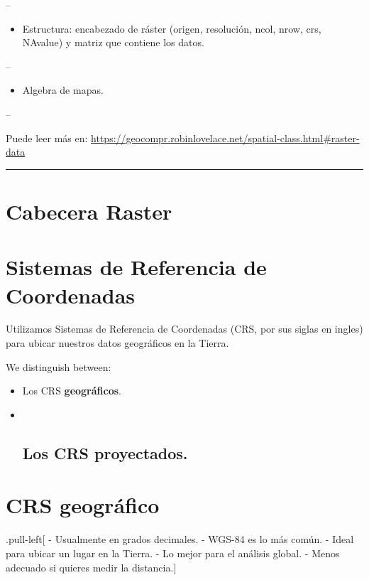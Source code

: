 \documentclass[]{article}
\providecommand{\tightlist}{%
  \setlength{\itemsep}{0pt}\setlength{\parskip}{0pt}}
\begin{document}
--

\begin{itemize}
\tightlist
\item
  Estructura: encabezado de ráster (origen, resolución, ncol, nrow, crs,
  NAvalue) y matriz que contiene los datos.
\end{itemize}

--

\begin{itemize}
\tightlist
\item
  Algebra de mapas.
\end{itemize}

--

Puede leer más en:
\url{https://geocompr.robinlovelace.net/spatial-class.html\#raster-data}

\begin{center}\rule{0.5\linewidth}{\linethickness}\end{center}

\section{Cabecera Raster}\label{cabecera-raster}

\section{Sistemas de Referencia de
Coordenadas}\label{sistemas-de-referencia-de-coordenadas}

Utilizamos Sistemas de Referencia de Coordenadas (CRS, por sus siglas en
ingles) para ubicar nuestros datos geográficos en la Tierra.

We distinguish between:

\begin{itemize}
\item
  Los CRS \textbf{geográficos}.
\item ~
  \subsection{\texorpdfstring{Los CRS
  \textbf{proyectados}.}{Los CRS proyectados.}}\label{los-crs-proyectados.}
\end{itemize}

\section{CRS geográfico}\label{crs-geografico}

.pull-left{[} - Usualmente en grados decimales. - WGS-84 es lo más
común. - Ideal para ubicar un lugar en la Tierra. - Lo mejor para el
análisis global. - Menos adecuado si quieres medir la distancia.{]}
\end{document}
